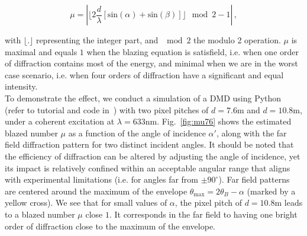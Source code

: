 \documentclass[12pt]{iopart}
\begin{document}
\begin{equation}
  \mu =
  \left|
  \lfloor 2 \frac{d}{\lambda}
  \left[
    \text{sin}(\alpha)  +\text{sin}(\beta)
    \right]
  \rfloor
  \mod{2} -1
  \right| \, ,
  \label{eq:blazed_number}
\end{equation}

with $\lfloor . \rfloor$ representing the integer part,
and $\mod{2}$ the modulo 2 operation.
$\mu$ is maximal and equals $1$ when the blazing equation is satisfield,
i.e. when one order of diffraction contains most of the energy,
and minimal when we are in the worst case scenario,
i.e. when four orders of diffraction have a significant and equal intensity.\\


To demonstrate the effect, we conduct a simulation of a DMD using Python
(refer to tutorial and code in~\cite{WFSnet_diffraction})
with two pixel pitches of
$d=7.6$\textmu m and $d=10.8$\textmu m,
under a coherent excitation at $\lambda=633$nm.
Fig.~\ref{fig:mu76} shows the estimated blazed number $\mu$
as a function of the angle of incidence $\alpha'$,
along with the far field diffraction pattern for two distinct incident angles.
It should be noted that the efficiency of diffraction can be altered by adjusting
the angle of incidence, yet its impact is relatively confined
within an acceptable angular range that aligns with experimental limitations
(i.e. for angles far from $\pm 90^\circ$).
Far field patterns are centered around the maximum of the envelope
$\theta_\text{max} = 2\theta_B - \alpha$
(marked by a yellow cross).
We see that for small values of $\alpha$,
the pixel pitch of $d=10.8$\textmu m leads to a blazed number $\mu$
close $1$.
It corresponds in the far field to having one bright order of diffraction
close to the maximum of the envelope.
\end{document}
